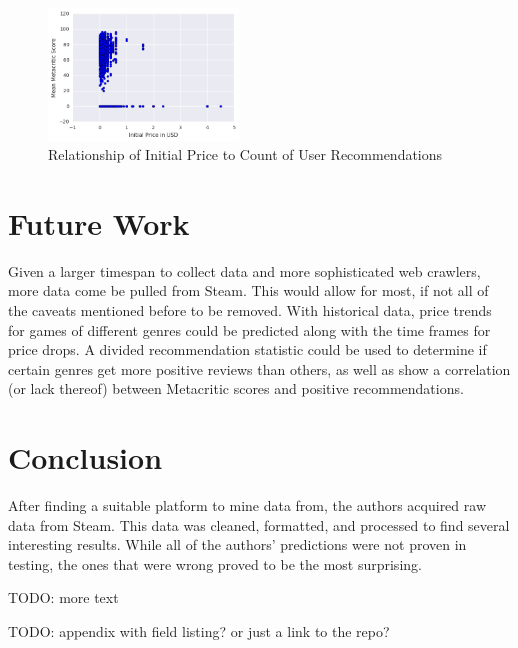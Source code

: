 \documentclass[letterpaper,10pt,twocolumn]{article}
\begin{document}
\begin{figure}[H]
    \label{fig:price-recommendations}
    \caption{Relationship of Initial Price to Count of User Recommendations}
    \includegraphics[width=0.45\textwidth,keepaspectratio]{price-metacritic-scatter}
\end{figure}



\section{Future Work}

Given a larger timespan to collect data and more sophisticated web crawlers,
more data come be pulled from Steam. This would allow for most, if not all of
the caveats mentioned before to be removed. With historical data, price
trends for games of different genres could be predicted along with the time
frames for price drops. A divided recommendation statistic could be used to
determine if certain genres get more positive reviews than others, as well as
show a correlation (or lack thereof) between Metacritic scores and positive
recommendations.


\section{Conclusion}

After finding a suitable platform to mine data from, the authors acquired raw
data from Steam. This data was cleaned, formatted, and processed to find
several interesting results. While all of the authors' predictions were not
proven in testing, the ones that were wrong proved to be the most surprising.

TODO: more text

TODO: appendix with field listing? or just a link to the repo?


\nocite{*}                                 %
\printbibliography

\end{document}
